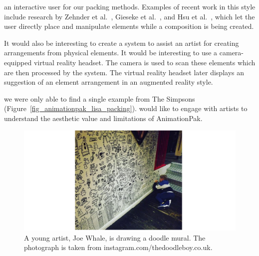  an interactive user  for our packing methods.
Examples of recent work in this style include research
by Zehnder et al.~\cite{Zehnder2016}, Gieseke et al.~\cite{Gieseke2017}, 
and Hsu et al.~\cite{Hsu2020}, which let the user directly place and manipulate
elements while a composition is being created.

\nnewtext
{
It would also be interesting to create a system to assist an artist for creating arrangements from physical elements.
It would be interesting to use a camera-equipped virtual reality headset. The camera is used to scan these elements which are then processed by the system.
The virtual reality headset later displays an suggestion of an element arrangement in an augmented reality style.
}

we were only able to find a single example from The Simpsons (Figure~\ref{fig_animationpak_lisa_packing}). 
 would like to engage with artists to understand the aesthetic value and limitations
of AnimationPak.

\begin{figure}
\centering
\includegraphics[width=1.0\textwidth]{figures/conclusions/doodle_boy.pdf}
\caption[A doodle mural by Joe Whale]
{ \label{doodle_boy} 
\newtext
{
A young artist, Joe Whale, is drawing a doodle mural. 
The photograph is taken from instagram.com/thedoodleboy.co.uk.
}
}
\end{figure}

